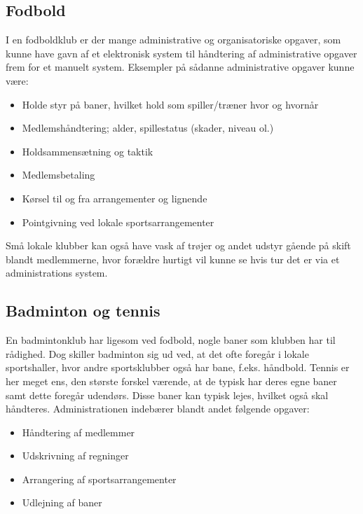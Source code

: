 \subsection{Fodbold} \label{Fodbold}

I en fodboldklub er der mange administrative og organisatoriske opgaver, som kunne have gavn af et elektronisk system
til håndtering af administrative opgaver frem for et manuelt system. Eksempler på sådanne
administrative opgaver kunne være:

\begin{itemize}
\item Holde styr på baner, hvilket hold som spiller/træner hvor og hvornår
\item Medlemshåndtering; alder, spillestatus (skader, niveau ol.)
\item Holdsammensætning og taktik
\item Medlemsbetaling
\item Kørsel til og fra arrangementer og lignende
\item Pointgivning ved lokale sportsarrangementer
\end{itemize}

Små lokale klubber kan også have vask af trøjer og andet udstyr gående på skift blandt medlemmerne, hvor forældre hurtigt vil kunne se hvis tur det er via et administrations system. 

\subsection{Badminton og tennis}

En badmintonklub har ligesom ved fodbold, nogle baner som klubben har til rådighed. Dog skiller badminton sig ud ved, at det ofte foregår i lokale sportshaller, hvor andre sportsklubber også har bane, f.eks. håndbold. Tennis er her meget ens, den største forskel værende, at de typisk har deres egne baner samt dette foregår udendørs. Disse baner kan typisk lejes, hvilket også skal håndteres. Administrationen indebærer blandt andet følgende opgaver:

\begin{itemize}
\item Håndtering af medlemmer
\item Udskrivning af regninger
\item Arrangering af sportsarrangementer
\item Udlejning af baner
\end{itemize}

